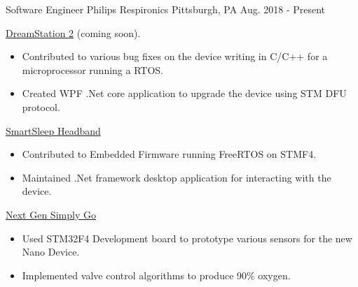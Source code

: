 


\begin{cventries}


\cventry
{Software Engineer} %
{Philips Respironics} %
{Pittsburgh, PA} %
{Aug. 2018 - Present} %
{ %
\begin{cvitems}
\item 
{
    \href{https://www.usa.philips.com/healthcare/product/HCNOCTN447/dreamstation-cpap-bi-level-therapy-systems}{\color{RoyalBlue}DreamStation 2} 
    (coming soon).
    \begin{itemize}
        \item Contributed to various bug fixes on the device writing in C/C++ for a microprocessor running a RTOS. 
        \item Created WPF .Net core application to upgrade the device using STM DFU protocol. 
    \end{itemize} 
}
\item 
{
    \href{https://www.usa.philips.com/c-e/smartsleep/deep-sleep-headband.html}{\color{RoyalBlue}SmartSleep Headband} 
    \begin{itemize}
        \item Contributed to Embedded Firmware running FreeRTOS on STMF4. 
        \item Maintained .Net framework desktop application for interacting with the device.
    \end{itemize} 
}
\item 
{
    \href{https://www.usa.philips.com/healthcare/product/HCNOCTN350/simplygo-mini-portable-oxygen-concentrator-poc}{\color{RoyalBlue}Next Gen Simply Go} 
    \begin{itemize}
        \item Used STM32F4 Development board to prototype various sensors for the new Nano Device.
        \item Implemented valve control algorithms to produce 90\% oxygen.

\end{itemize}}
\end{cvitems}}
\end{cventries}

